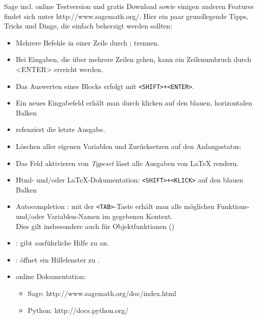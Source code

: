\documentclass[fontsize=12pt,paper=a4,twoside,bibtotoc,idxtotoc,
liststotoc,pagesize,BCOR1.2cm,DIV15,chapterprefix,pagesize=pdftex]{scrbook}
\begin{document}
Sage incl. online Testversion und gratis Download sowie einigen anderen Features findet sich unter http://www.sagemath.org/.\newline
Hier ein paar grundlegende Tipps, Tricks und Dinge, die einfach beherzigt werden sollten:\newline
\begin{itemize}
 \item Mehrere Befehle in einer Zeile durch ; trennen. 
 \item Bei Eingaben, die über mehrere Zeilen gehen, kann ein
  Zeilenumbruch durch <ENTER> erreicht werden.
 \item Das Auswerten eines Blocks erfolgt mit {\color{blue} \verb~<SHIFT>+<ENTER>~}.
 \item Ein neues Eingabefeld erhält man durch klicken auf den blauen, horizontalen Balken
 \item {\color{blue} \isage{_} } refenziert die letzte Ausgabe.
 \item Löschen aller eigenen Variablen und Zurücksetzen auf den Anfangsstatus: {\color{blue} }
 \item Das Feld aktivieren von \emph{Typeset} lässt alle Ausgaben von \LaTeX{} rendern.
 \item Html- und/oder \LaTeX-Dokumentation:{\color{blue} \verb~<SHIFT>+<KLICK>~ }auf den blauen Balken
 \item {\color{blue} Autocompletion :} mit der {\color{blue} \verb~<TAB>~}-Taste erhält man alle möglichen Funktions- und/oder Variablen-Namen im gegebenen Kontext.\\
  Dies gilt insbesondere auch für Objektfunktionen ()
 \item {\color{blue}  :} gibt ausführliche Hilfe zu  an.
 \item {\color{blue}  :} öffnet ein Hilfefenster zu .
 \item online Dokumentation:
  \begin{itemize}
   \item Sage: http://www.sagemath.org/doc/index.html
   \item Python: http://docs.python.org/
  \end{itemize}
\end{itemize}
\newpage
\end{document}
